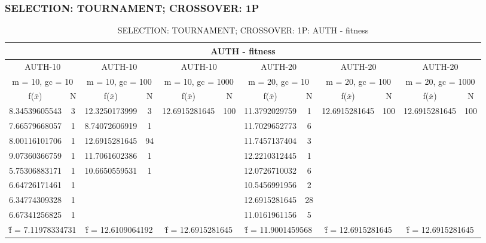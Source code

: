 \subsubsection{SELECTION: TOURNAMENT; CROSSOVER: 1P}
\begin{table}[H]
	\centering
	\caption{SELECTION: TOURNAMENT; CROSSOVER: 1P: AUTH - fitness}
	\begin{adjustbox}{width=1\textwidth}
		\begin{tabular}{ |c|c||c|c||c|c||c|c||c|c||c|c| }
			\hline
			\multicolumn{12}{|c|}{AUTH - fitness} \\
			\hline
			\multicolumn{2}{|c||}{AUTH-10} & \multicolumn{2}{c||}{AUTH-10} & \multicolumn{2}{c||}{AUTH-10} & \multicolumn{2}{c||}{AUTH-20} & \multicolumn{2}{c||}{AUTH-20} & \multicolumn{2}{c|}{AUTH-20}\\
			\hline
			\multicolumn{2}{|c||}{m = 10, gc = 10} & \multicolumn{2}{c||}{m = 10, gc = 100} & \multicolumn{2}{c||}{m = 10, gc = 1000} & \multicolumn{2}{c||}{m = 20, gc = 10} & \multicolumn{2}{c||}{m = 20, gc = 100} & \multicolumn{2}{c|}{m = 20, gc = 1000}\\
			\hline
			f($\bar{x}$) & N & f($\bar{x}$) & N & f($\bar{x}$) & N & f($\bar{x}$) & N & f($\bar{x}$) & N & f($\bar{x}$) & N\\
			\hline
			\hline
			8.34539605543 & 3 & 12.3250173999 & 3 & 12.6915281645 & 100 & 11.3792029759 & 1 & 12.6915281645 & 100 & 12.6915281645 & 100\\
			7.66579668057 & 1 & 8.74072606919 & 1 &   &   & 11.7029652773 & 6 &   &   &   &  \\
			8.00116101706 & 1 & 12.6915281645 & 94 &   &   & 11.7457137404 & 3 &   &   &   &  \\
			9.07360366759 & 1 & 11.7061602386 & 1 &   &   & 12.2210312445 & 1 &   &   &   &  \\
			5.75306883171 & 1 & 10.6650559531 & 1 &   &   & 12.0726710032 & 6 &   &   &   &  \\
			6.64726171461 & 1 &   &   &   &   & 10.5456991956 & 2 &   &   &   &  \\
			6.34774309328 & 1 &   &   &   &   & 12.6915281645 & 28 &   &   &   &  \\
			6.67341256825 & 1 &   &   &   &   & 11.0161961156 & 5 &   &   &   &  \\
			\hline
			\multicolumn{2}{|c||}{\^{f} = 7.11978334731} & \multicolumn{2}{c||}{\^{f} = 12.6109064192} & \multicolumn{2}{c||}{\^{f} = 12.6915281645} & \multicolumn{2}{c||}{\^{f} = 11.9001459568} & \multicolumn{2}{c||}{\^{f} = 12.6915281645} & \multicolumn{2}{c|}{\^{f} = 12.6915281645}\\
			\hline
		\end{tabular}
	\end{adjustbox}
\end{table}
